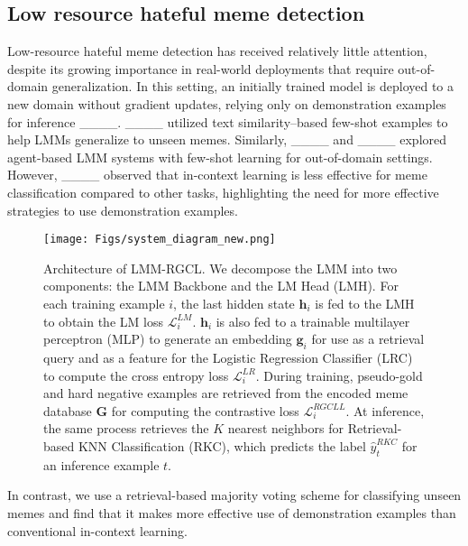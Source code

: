 \subsection{Low resource hateful meme detection} 
Low-resource hateful meme detection has received relatively little attention, despite its growing importance in real-world deployments that require out-of-domain generalization. In this setting, an initially trained model is deployed to a new domain without gradient updates, relying only on demonstration examples for inference ____.  ____ utilized text similarity–based few-shot examples to help LMMs generalize to unseen memes. Similarly, ____ and ____ explored agent-based LMM systems with few-shot learning for out-of-domain settings. However, ____ observed that in-context learning is less effective for meme classification compared to other tasks, highlighting the need for more effective strategies to use demonstration examples.
\begin{figure*}[h!]
    \centering
    \texttt{[image: Figs/system\_diagram\_new.png]}
    \caption{Architecture of LMM-RGCL.
    We decompose the LMM into two components: the LMM Backbone and the LM Head (LMH). For each training example $i$, the last hidden state $\mathbf{h}_i$ is fed to the LMH to obtain the LM loss $\mathcal{L}_i^{LM}$. $\mathbf{h}_i$ is also fed to a trainable multilayer perceptron (MLP) to generate an embedding $\mathbf{g}_i$ for use as a retrieval query and as a feature for the Logistic Regression Classifier (LRC) to compute the cross entropy loss $\mathcal{L}_i^{LR}$. During training, pseudo-gold and hard negative examples are retrieved from the encoded meme database $\mathbf{G}$ for computing the contrastive loss $\mathcal{L}_i^{RGCLL}$. At inference, the same process retrieves the $K$ nearest neighbors for Retrieval-based KNN Classification (RKC),  which predicts the label $\hat{y}_t^{RKC}$ for an inference example $t$.}
    \label{fig:system}
\end{figure*}
In contrast, we use a retrieval-based majority voting scheme for classifying unseen memes and find that it makes more effective use of demonstration examples than conventional in-context learning.